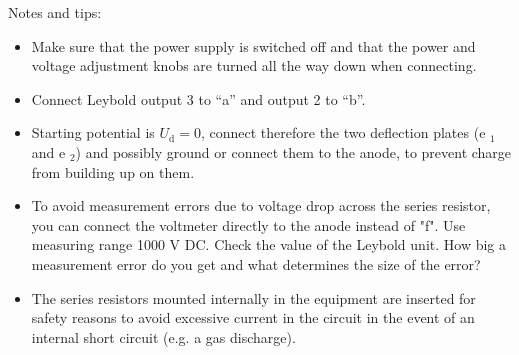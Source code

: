 \documentclass[../Elmag-labhefte-2020.tex]{subfiles}
\begin{document}
Notes and tips:
\begin{itemize}
    \item Make sure that the power supply is switched off and that the power and voltage adjustment knobs are turned all the way down when connecting.
    \item Connect Leybold output 3 to ``a'' and output 2 to ``b''.
    \item Starting potential is $U_\mathrm{d} = 0$, connect therefore the two deflection plates (e $_1$ and e $_2$) and possibly ground or connect them to the anode, to prevent charge from building up on them.
    \item To avoid measurement errors due to voltage drop across the series resistor, you can connect the voltmeter directly to the anode instead of "f". Use measuring range 1000 V DC. Check the value of the Leybold unit. How big a measurement error do you get and what determines the size of the error?
    \item The series resistors mounted internally in the equipment are inserted for safety reasons to avoid excessive current in the circuit in the event of an internal short circuit (e.g. a gas discharge).
\end{itemize}
 








\end{document}
